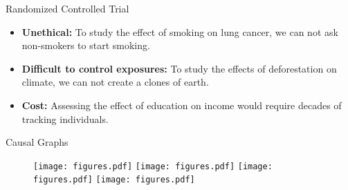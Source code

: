\documentclass[aspectratio=169]{beamer}
\begin{document}
\begin{frame}{Randomized Controlled Trial}
	
	\vspace{2em}

	\begin{itemize}[<+->]
		\item \textbf{Unethical: } To study the effect of smoking on lung cancer, we can not ask non-smokers to start smoking.
		\item \textbf{Difficult to control exposures:} To study the effects of deforestation on climate, we can not create a clones of earth.
		\item \textbf{Cost:} Assessing the effect of education on income would require decades of tracking individuals.
	\end{itemize}

	\vspace{2em}

\end{frame}

\begin{frame}{Causal Graphs}
	\vspace{1em}
	\begin{figure}
		\begin{overprint}
			 \center \texttt{[image: figures.pdf]}
			\onslide<2> \center \texttt{[image: figures.pdf]}
			\onslide<3> \center \texttt{[image: figures.pdf]}
			\onslide<4> \center \texttt{[image: figures.pdf]}
		\end{overprint}
	\end{figure}

	\vspace{1em}
\end{frame}

% 
% 
% 
\end{document}
